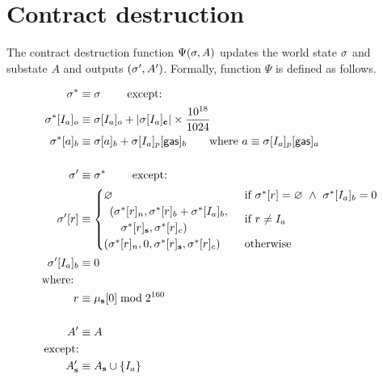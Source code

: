 

\section{Contract destruction}\label{sec:contract_destruct}

The contract destruction function $\Psi(\mathbf{\sigma},A)$ updates the world state $\mathbf{\sigma}$ and substate $A$ and outputs $(\mathbf{\sigma}',A')$. Formally, function $\Psi$ is defined as follows.

\begin{align}
	\st^*  &\eqdef \st \qquad \mbox{ except:}\\
		\st^*[I_a]_o &\eqdef \st[I_a]_o + \left|\st[I_a]_{\bf c}\right|\times \collateralperbyte \\
		\st^*[a]_b&\eqdef\st[a]_b+\st[I_a]_p[{\sf gas}]_b
		\qquad\text{where $a  \eqdef \st[I_a]_p[{\sf gas}]_a$}\\ 
	\notag \\ 
	\st'  &\eqdef \st^* \qquad \mbox{ except:}\\
	\st'[r] &\equiv \begin{cases}
		\varnothing &\text{if}\ \st^*[r] = \varnothing\ \wedge\ \st^*[I_{a}]_{b} = 0\\
		\begin{array}{l}
			(\st^*[r]_{n}, \st^*[r]_{b} + \st^*[I_{a}]_{b}, \\
			\quad\st^*[r]_{\mathbf{s}}, \st^*[r]_{c})
		\end{array} & \text{if}\ r \neq I_{a}\\
		(\st^*[r]_{n}, 0, \st^*[r]_{\mathbf{s}}, \st^*[r]_{c}) & \text{otherwise}
	\end{cases}\\
	\st'[I_{a}]_{b} &\eqdef 0 \\
		\mbox{where: } &\\ 
		 r &\eqdef \mst_{\mathbf{s}}[0] \bmod 2^{160} \\
	\notag \\
	A' & \eqdef A \\
	\mbox{except:} & \\ 
	A'_{\mathbf{s}} &\eqdef A_{\mathbf{s}} \cup \{I_a\}
\end{align}